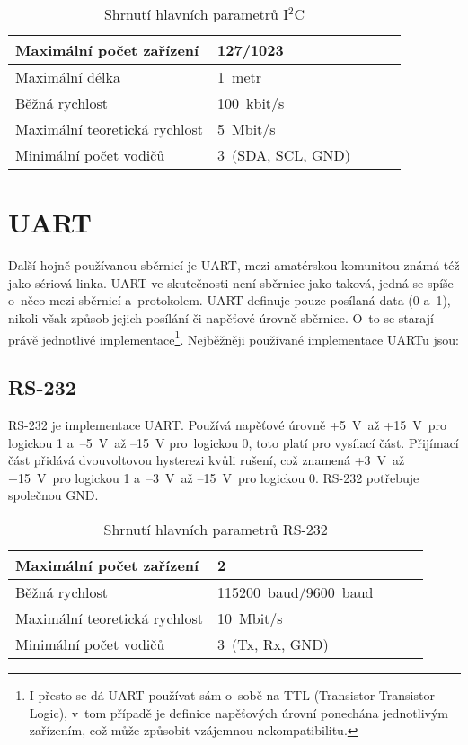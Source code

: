 \begin{table}[h]
		
	\centering
	\begin{tabular}{|l|l|l|l|l|} \hline
		Maximální počet zařízení   & 127/1023          \\ \hline
		Maximální délka               & 1~metr            \\ \hline
		Běžná rychlost                & 100~kbit/s        \\ \hline
		Maximální teoretická rychlost & 5~Mbit/s          \\ \hline
		Minimální počet vodičů      & 3~(SDA, SCL, GND) \\ \hline
	\end{tabular}
	\caption{Shrnutí hlavních parametrů I$^{2}$C}
\end{table}



\section{UART}
Další hojně používanou sběrnicí je UART, mezi amatérskou komunitou známá též jako sériová linka.
UART ve skutečnosti není sběrnice jako taková, jedná se spíše o~něco mezi sběrnicí a~protokolem.
UART definuje pouze posílaná data (0 a~1), nikoli však způsob jejich posílání či napěťové úrovně sběrnice.
O~to se starají právě jednotlivé implementace\footnote{I přesto se dá UART používat sám o~sobě na TTL (Transistor-Transistor-Logic), v~tom případě je definice napěťových úrovní ponechána jednotlivým zařízením, což může způsobit vzájemnou nekompatibilitu.}.
Nejběžněji používané implementace UARTu jsou:
\subsection{RS-232} %
RS-232 \cite{RS-232} je implementace UART.
Používá napěťové úrovně +5~V~až +15~V~pro logickou 1 a~--5~V~až --15~V   pro~logickou 0, toto platí pro vysílací část.
Přijímací část přidává dvouvoltovou hysterezi kvůli rušení, což znamená +3~V~až +15~V~pro logickou 1 a~--3~V~až --15~V~pro logickou 0.
RS-232 potřebuje společnou GND.
\begin{table}[h]
		
	\centering
	\begin{tabular}{|l|l|l|l|l|} \hline
		Maximální počet zařízení   & 2                     \\ \hline
		Běžná rychlost                & 115200~baud/9600~baud \\ \hline
		Maximální teoretická rychlost & 10~Mbit/s             \\ \hline
		Minimální počet vodičů      & 3~(Tx, Rx, GND)       \\ \hline
	\end{tabular}
	\caption{Shrnutí hlavních parametrů RS-232}
\end{table}
